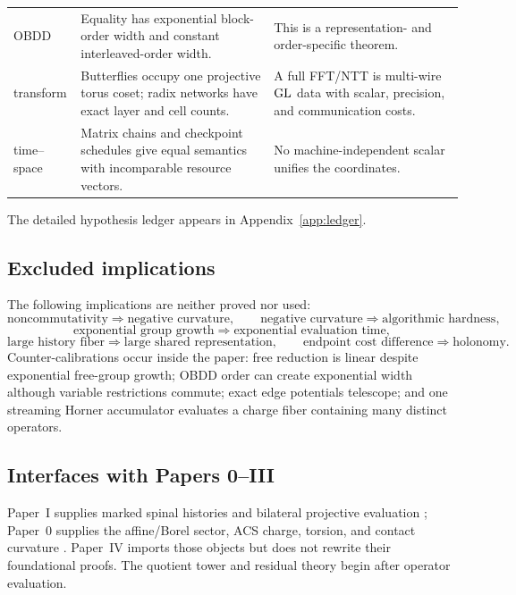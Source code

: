 \begin{center}
\begin{longtable}{L{0.16\textwidth}L{0.46\textwidth}L{0.27\textwidth}}
OBDD & Equality has exponential block-order width and constant interleaved-order width. & This is a representation- and order-specific theorem.\\
transform & Butterflies occupy one projective torus coset; radix networks have exact layer and cell counts. & A full FFT/NTT is multi-wire $\operatorname{GL}$ data with scalar, precision, and communication costs.\\
time--space & Matrix chains and checkpoint schedules give equal semantics with incomparable resource vectors. & No machine-independent scalar unifies the coordinates.\\
\bottomrule
\end{longtable}
\end{center}

The detailed hypothesis ledger appears in Appendix~\ref{app:ledger}.

\subsection{Excluded implications}

The following implications are neither proved nor used:
\[
  \text{noncommutativity}\Longrightarrow\text{negative curvature},
  \qquad
  \text{negative curvature}\Longrightarrow\text{algorithmic hardness},
\]
\[
  \text{exponential group growth}\Longrightarrow\text{exponential evaluation time},
\]
\[
  \text{large history fiber}\Longrightarrow\text{large shared representation},
  \qquad
  \text{endpoint cost difference}\Longrightarrow\text{holonomy}.
\]
Counter-calibrations occur inside the paper: free reduction is linear despite
exponential free-group growth; OBDD order can create exponential width although
variable restrictions commute; exact edge potentials telescope; and one
streaming Horner accumulator evaluates a charge fiber containing many distinct
operators.

\subsection{Interfaces with Papers 0--III}

Paper~I supplies marked spinal histories and bilateral projective evaluation
\cite{Yuan2026AEGFoundations}; Paper~0 supplies the affine/Borel sector, ACS
charge, torsion, and contact curvature \cite{Yuan2026AEGPaperZero}.  Paper~IV
imports those objects but does not
rewrite their foundational proofs.  The quotient tower and residual theory
begin after operator evaluation.

